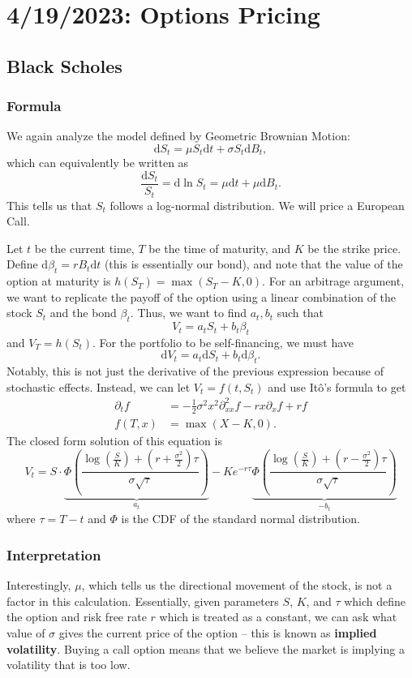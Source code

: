 \chapter{4/19/2023: Options Pricing}
\section{Black Scholes}
\subsection{Formula}
We again analyze the model defined by Geometric Brownian Motion: $$ \mathrm dS_t = \mu S_t \mathrm dt + \sigma S_t \mathrm dB_t, $$ which can equivalently be written as $$ \frac{\mathrm dS_t}{S_t} = \mathrm d\ln S_t = \mu\mathrm dt + \mu\mathrm d B_t. $$ This tells us that $S_t$ follows a log-normal distribution. We will price a European Call.

Let $t$ be the current time, $T$ be the time of maturity, and $K$ be the strike price. Define $ \mathrm d\beta_t = r B_t\mathrm dt $ (this is essentially our bond), and note that the value of the option at maturity is $h(S_T) = \max(S_T-K,0)$. For an arbitrage argument, we want to replicate the payoff of the option using a linear combination of the stock $S_t$ and the bond $\beta_t$. Thus, we want to find $a_t,b_t$ such that $$ V_t = a_tS_t + b_t\beta_t $$ and $V_T = h(S_t)$. For the portfolio to be self-financing, we must have $$ \mathrm dV_t = a_t\mathrm dS_t + b_t\mathrm d\beta_t. $$ Notably, this is not just the derivative of the previous expression because of stochastic effects. Instead, we can let $V_t=f(t,S_t)$ and use It\^{o}'s formula to get \begin{align*}
	\partial_t f &= -\frac{1}{2}\sigma^2 x^2\partial_{xx}^2 f - rx\partial_x f + rf \\
	f(T,x) &= \max(X-K,0).
\end{align*} The closed form solution of this equation is $$ 
V_t = S\cdot\underbrace{\Phi \left( \frac{\log \left( \frac{S}{K} \right) + \left( r + \frac{\sigma^2}{2} \right) \tau}{\sigma\sqrt{\tau}} \right)}_{a_t} - K e^{-r\tau} \underbrace{\Phi \left( \frac{\log \left( \frac{S}{K} \right) + \left( r - \frac{\sigma^2}{2} \right) \tau}{\sigma\sqrt{\tau}} \right)}_{-b_t}
$$ where $\tau=T-t$ and $\Phi$ is the CDF of the standard normal distribution.

\subsection{Interpretation}
Interestingly, $\mu$, which tells us the directional movement of the stock, is not a factor in this calculation. Essentially, given parameters $S$, $K$, and $\tau$ which define the option and risk free rate $r$ which is treated as a constant, we can ask what value of $\sigma$ gives the current price of the option -- this is known as \textbf{implied volatility}. Buying a call option means that we believe the market is implying a volatility that is too low.

